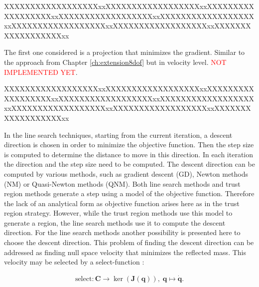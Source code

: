 XXXXXXXXXXXXXXXXXXxxXXXXXXXXXXXXXXXXXXxxXXXXXXXXXXXXXXXXXXxxXXXXXXXXXXXXXXXXXXxxXXXXXXXXXXXXXXXXXXxxXXXXXXXXXXXXXXXXXXxxXXXXXXXXXXXXXXXXXXxxXXXXXXXXXXXXXXXXXXxx

The first one considered is a projection that minimizes the gradient. Similar to the approach from Chapter \ref{ch:extension8dof} but in velocity level.\textcolor{red}{ NOT IMPLEMENTED YET}.

XXXXXXXXXXXXXXXXXXxxXXXXXXXXXXXXXXXXXXxxXXXXXXXXXXXXXXXXXXxxXXXXXXXXXXXXXXXXXXxxXXXXXXXXXXXXXXXXXXxxXXXXXXXXXXXXXXXXXXxxXXXXXXXXXXXXXXXXXXxxXXXXXXXXXXXXXXXXXXxx


In the line search techniques, starting from the current iteration, a descent direction is chosen in order to minimize the objective function. Then the step size is computed to determine the distance to move in this direction. In each iteration the direction and the step size need to be computed. The descent direction can be computed by various methods, such as gradient descent (GD), Newton methods (NM) or Quasi-Newton methods (QNM). %
Both line search methods and trust region methods generate a step using a model of the objective function. Therefore the lack of an analytical form as objective function arises here as in the trust region strategy.
However, while the trust region methods use this model to generate a region, the line search methods use it to compute the descent direction.  For the line search methods another possibility is presented here to choose the descent direction. 
This problem of finding the descent direction can be addressed as finding null space velocity that minimizes the reflected mass. This velocity may be selected by a  select-function :

\begin{align}
\text{select}: \mathbf{C}\rightarrow\ker(\mathbf{J}(\mathbf{q})),\; \mathbf{q}\mapsto\dot{\mathbf{q}} .
\end{align}

%
%

